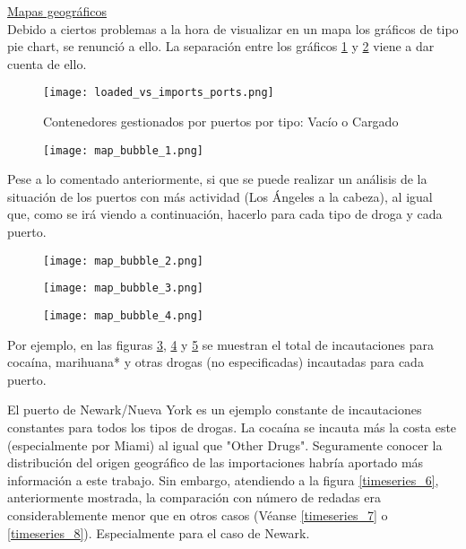 \documentclass[12pt]{article}
\begin{document}
		
		\underline{Mapas geográficos}\\
		Debido a ciertos problemas a la hora de visualizar en un mapa los gráficos de tipo pie chart, se renunció a ello. La separación entre los gráficos \ref{loaded_vs_imports_ports} y \ref{map_bubble_1} viene a dar cuenta de ello.
		
		\begin{figure}[H]
			\caption{\label{loaded_vs_imports_ports} Contenedores gestionados por puertos por tipo: Vacío o Cargado}
			\centering
			\hspace*{1cm}
			\texttt{[image: loaded\_vs\_imports\_ports.png]}
		\end{figure}
	
		
		\begin{figure}[H]
			\caption{\label{map_bubble_1} }
			\centering
			\hspace*{1cm}
			\texttt{[image: map\_bubble\_1.png]}
		\end{figure}

		Pese a lo comentado anteriormente, si que se puede realizar un análisis de la situación de los puertos con más actividad (Los Ángeles a la cabeza), al igual que, como se irá viendo a continuación, hacerlo para cada tipo de droga y cada puerto.
		
		\begin{figure}[H]
			\caption{\label{map_bubble_2} }
			\centering
			\hspace*{1cm}
			\texttt{[image: map\_bubble\_2.png]}
		\end{figure}
	
		\begin{figure}[H]
			\caption{\label{map_bubble_3} }
			\centering
			\hspace*{1cm}
			\texttt{[image: map\_bubble\_3.png]}
		\end{figure}
	
		\begin{figure}[H]
			\caption{\label{map_bubble_4} }
			\centering
			\hspace*{1cm}
			\texttt{[image: map\_bubble\_4.png]}
		\end{figure}
	
		Por ejemplo, en las figuras \ref{map_bubble_2}, \ref{map_bubble_3} y \ref{map_bubble_4} se muestran el total de incautaciones para cocaína, marihuana* y otras drogas (no especificadas) incautadas para cada puerto.
		
		El puerto de Newark/Nueva York es un ejemplo constante de incautaciones constantes para todos los tipos de drogas. La cocaína se incauta más la costa este (especialmente por Miami) al igual que "Other Drugs". Seguramente conocer la distribución del origen geográfico de las importaciones habría aportado más información a este trabajo. Sin embargo, atendiendo a la figura \ref{timeseries_6}, anteriormente mostrada, la comparación con número de redadas era considerablemente menor que en otros casos (Véanse \ref{timeseries_7} o \ref{timeseries_8}). Especialmente para el caso de Newark.
		
\end{document}
